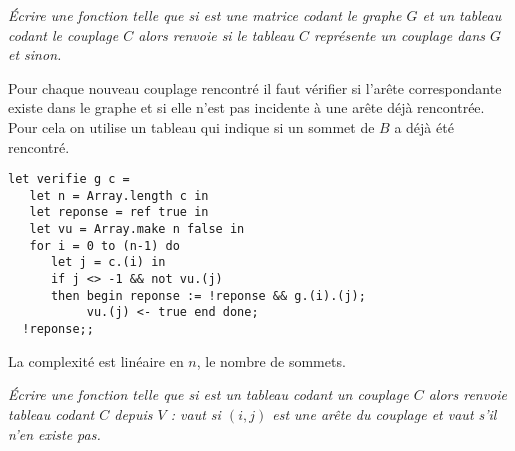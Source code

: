 \begin{center}
\end{center}
\begin{Exercise}[title=]\it
Écrire  une fonction  telle que si  est une matrice codant le graphe $G$ et  un tableau codant le couplage $C$ alors  renvoie  si le tableau $C$ représente un couplage dans $G$ et  sinon.
\end{Exercise}
\begin{Answer}
Pour chaque nouveau couplage rencontré il faut vérifier si l'arête correspondante existe dans le graphe et si elle n'est pas incidente à une arête déjà rencontrée. Pour cela on utilise un tableau  qui indique si un sommet de $B$ a déjà été rencontré.
\begin{lstlisting}
let verifie g c =
   let n = Array.length c in
   let reponse = ref true in
   let vu = Array.make n false in
   for i = 0 to (n-1) do
      let j = c.(i) in
      if j <> -1 && not vu.(j)
      then begin reponse := !reponse && g.(i).(j);
           vu.(j) <- true end done;
  !reponse;;
\end{lstlisting}
La complexité est linéaire en $n$, le nombre de sommets.
\end{Answer}
\begin{Exercise}[title=]\it
Écrire  une fonction  telle que si  est un tableau codant un couplage $C$ alors  renvoie tableau  codant $C$ depuis $V$ :  vaut  si $(i, j)$ est une arête du couplage et vaut  s'il n'en existe pas.
\end{Exercise}
